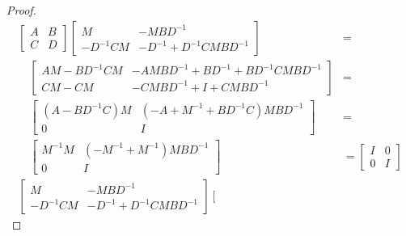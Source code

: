 \begin{proof}
    \begin{align*}
        \left[\begin{array}{cc}
                  A&B\\
                  C&D
        \end{array}\right]\left[\begin{array}{cc}
                                    M&-MBD^{-1}\\
                                    -D^{-1}CM&-D^{-1}+D^{-1}CMBD^{-1}
        \end{array}\right]&=\\
                                \quad\left[\begin{array}{cc}
                                         AM-BD^{-1}CM&-AMBD^{-1}+BD^{-1}+BD^{-1}CMBD^{-1}\\
                                         CM-CM&-CMBD^{-1}+I+CMBD^{-1}
                                \end{array}\right]&=\\
                                \quad\left[\begin{array}{cc}
                                               (A-BD^{-1}C)M&(-A+M^{-1}+BD^{-1}C)MBD^{-1}\\
                                               0&I
                                \end{array}\right]&=\\
                                \quad\left[\begin{array}{cc}
                                               M^{-1}M&(-M^{-1}+M^{-1})MBD^{-1}\\
                                               0&I
                                \end{array}\right]&=\left[\begin{array}{cc}
                                                              I&0\\
                                                              0&I
                                                           \end{array}\right]\\
        \left[\begin{array}{cc}
                  M&-MBD^{-1}\\
                  -D^{-1}CM&-D^{-1}+D^{-1}CMBD^{-1}
        \end{array}\right]\left[\begin{array}{cc}

\end{array}
\end{align*}
\end{proof}
